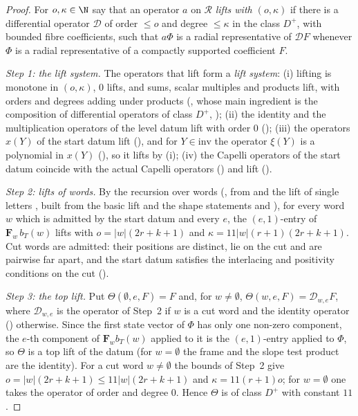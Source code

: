 \begin{proof}
For $o,\kappa\in\N$ say that an operator $a$ on $\mathcal R$ \emph{lifts with $(o,\kappa)$} if there is a differential
operator $\mathcal D$ of order $\le o$ and degree $\le\kappa$ in the class $D^+$, with bounded fibre coefficients, such that
$a\Phi$ is a radial representative of $\mathcal DF$ whenever $\Phi$ is a radial representative of a compactly supported
coefficient $F$.

\emph{Step 1: the lift system.} The operators that lift form a \emph{lift system}:
(i) lifting is monotone in $(o,\kappa)$, $0$ lifts, and sums, scalar multiples and products lift, with orders and degrees
adding under products (, whose main ingredient is the
composition of differential operators of class $D^+$,
);
(ii) the identity and the multiplication operators of the level datum lift with order $0$
();
(iii) the operators $x(Y)$ of the start datum lift (), and for $Y\in
\mathrm{inv}$ the operator $\xi(Y)$ is a polynomial in $x(Y)$ (),
so it lifts by (i);
(iv) the Capelli operators of the start datum coincide with the actual Capelli operators
() and lift
().

\emph{Step 2: lifts of words.} By the recursion over words (, from
 and the lift of single letters
, built from the basic lift
 and the shape statements
 and ), for every word $w$ which is
admitted by the start datum and every $e$, the $(e,1)$-entry of $\mathbf F_w\,b_T(w)$ lifts with
$o=|w|(2r+k+1)$ and $\kappa=11|w|(r+1)(2r+k+1)$. Cut words are admitted: their positions are distinct, lie on the cut and
are pairwise far apart, and the start datum satisfies the interlacing and positivity conditions on the cut
().

\emph{Step 3: the top lift.} Put $\Theta(\emptyset,e,F)=F$ and, for $w\ne\emptyset$, $\Theta(w,e,F)=\mathcal D_{w,e}F$, where
$\mathcal D_{w,e}$ is the operator of Step~2 if $w$ is a cut word and the identity operator
() otherwise. Since the first state vector of $\Phi$ has only one
non-zero component, the $e$-th component of $\mathbf F_wb_T(w)$ applied to it is the $(e,1)$-entry applied to $\Phi$, so
$\Theta$ is a top lift of the datum (for $w=\emptyset$ the frame and the slope test product are the identity). For a cut word
$w\ne\emptyset$ the bounds of Step~2 give $o=|w|(2r+k+1)\le11|w|(2r+k+1)$ and $\kappa=11(r+1)o$; for $w=\emptyset$ one takes the
operator of order and degree $0$. Hence $\Theta$ is of class $D^+$ with constant $11$.
\end{proof}

